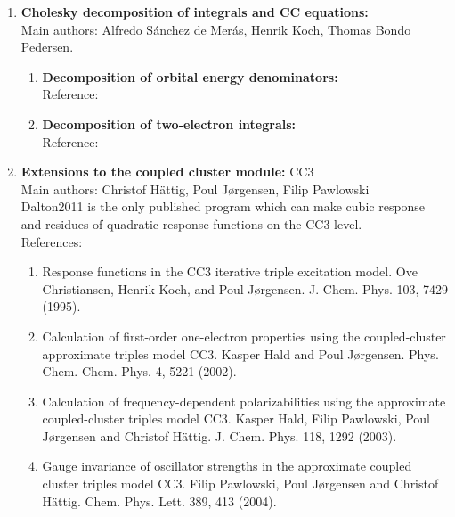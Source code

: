 \begin{enumerate}

\item{\bf Cholesky decomposition of integrals and CC equations:} \\
Main authors: Alfredo S{\'a}nchez {de Mer{\'a}s}, Henrik Koch,
Thomas Bondo Pedersen.
\begin{enumerate}
  \item{\bf Decomposition of orbital energy denominators:}  \\
   Reference: 
   \cite{jcp_chopt}
  \item{\bf Decomposition of two-electron integrals:}  \\
   Reference: 
   \cite{choint}
\end{enumerate}

\item{\bf Extensions to the coupled cluster module:} CC3 \\
Main authors: Christof H\"{a}ttig, Poul J\o rgensen, Filip Pawlowski \\
Dalton2011 is the only published program which can make cubic response
and residues of quadratic response functions on the CC3 level. \\
   References:
\begin{enumerate}
\item	Response functions in the CC3 iterative triple excitation model.
Ove Christiansen, Henrik Koch, and Poul J\o rgensen.
J. Chem. Phys. 103, 7429 (1995).

\item	Calculation of first-order one-electron properties using the
coupled-cluster approximate triples model CC3.
Kasper Hald and Poul J\o rgensen.
Phys. Chem. Chem. Phys. 4, 5221 (2002).

\item	Calculation of frequency-dependent polarizabilities using the
approximate coupled-cluster triples model CC3.
Kasper Hald, Filip Pawlowski, Poul J\o rgensen and Christof H\"{a}ttig.
J. Chem. Phys. 118, 1292 (2003).

\item	Gauge invariance of oscillator strengths in the approximate
coupled
cluster triples model CC3.
Filip Pawlowski, Poul J\o rgensen and Christof H\"{a}ttig.
Chem. Phys. Lett. 389, 413 (2004).


\end{enumerate}
\end{enumerate}
